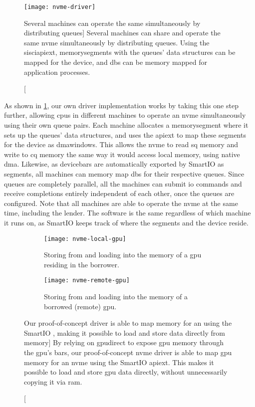 \begin{figure}
    \centering
    \texttt{[image: nvme-driver]}
    \caption
    [Several machines can operate the same  simultaneously by distributing queues]
    {Several machines can share and operate the same \gls{nvme} simultaneously by distributing queues. Using the \gls{sisciapiext}, \glspl{memorysegment} with the queues' data structures can be mapped for the device, and \glspl{db} can be memory mapped for application processes.}
    \label{fig:nvme-driver}
\end{figure}


As shown in \cref{fig:nvme-driver}, our own driver implementation works by taking this one step further, allowing \glspl{cpu} in different machines to operate an \gls{nvme} simultaneously using their own queue pairs.
%
Each machine allocates a \gls{memorysegment} where it sets up the queues' data structures, and uses the \gls{apiext} to map these segments for the device as \glspl{dmawindow}.
%
This allows the \gls{nvme} to read \gls{sq} memory and write to \gls{cq} memory the same way it would access local memory, using native \gls{dma}.
%
Likewise, as \glspl{devicebar} are automatically exported by SmartIO as \glspl{segment}, all machines can memory map \glspl{db} for their respective queues.
%
Since queues are completely parallel, all the machines can submit \gls{io} commands and receive completions entirely independent of each other, once the queues are configured.
%
Note that all machines are able to operate the \gls{nvme} at the same time, including the \gls{lender}.
%
The software is the same regardless of which machine it runs on, as SmartIO keeps track of where the \glspl{segment} and the device reside.


\begin{figure}
    \centering
    \begin{subfigure}{\linewidth}
        \centering
        \texttt{[image: nvme-local-gpu]}
        \caption{Storing from and loading into the memory of a \gls{gpu} residing in the \gls{borrower}.}
        \label{fig:nvme-local-gpu}
    \end{subfigure}
    \par\vspace{5mm}
    \begin{subfigure}{\linewidth}
        \centering
        \texttt{[image: nvme-remote-gpu]}
        \caption{Storing from and loading into the memory of a borrowed (remote) \gls{gpu}.}
        \label{fig:nvme-remote-gpu}
    \end{subfigure}
    \caption
    [Our proof-of-concept  driver is able to map  memory for an  using the SmartIO , making it possible to load and store data directly from  memory]
    {By relying on \gls{gpudirect} to expose \gls{gpu} memory through the \gls{gpu}'s \glspl{bar}, our proof-of-concept \gls{nvme} driver is able to map \gls{gpu} memory for an \gls{nvme} using the SmartIO \gls{apiext}. This makes it possible to load and store \gls{gpu} data directly, without unnecessarily copying it via \gls{ram}.}
    \label{fig:nvme-gpu}
\end{figure}


